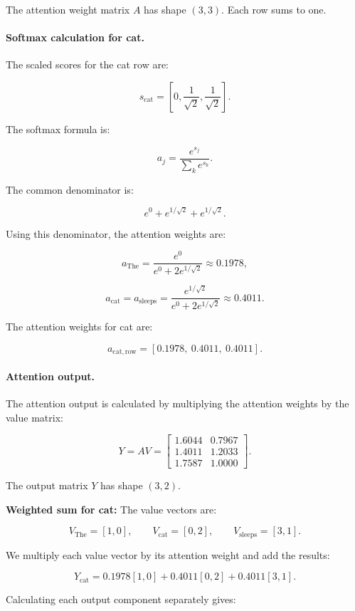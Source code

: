 \documentclass[11pt]{article}
\begin{document}
The attention weight matrix $A$ has shape $(3,3)$.
Each row sums to one.

\paragraph{Softmax calculation for cat.}

The scaled scores for the cat row are:

\[
s_{\mathrm{cat}}=
\left[
0,\frac{1}{\sqrt{2}},\frac{1}{\sqrt{2}}
\right].
\]

The softmax formula is:

\[
a_j=\frac{e^{s_j}}{\sum_k e^{s_k}}.
\]

The common denominator is:

\[
e^0+e^{1/\sqrt{2}}+e^{1/\sqrt{2}}.
\]

Using this denominator, the attention weights are:

\[
a_{\mathrm{The}}
=
\frac{e^0}
{e^0+2e^{1/\sqrt{2}}}
\approx 0.1978,
\]

\[
a_{\mathrm{cat}}
=
a_{\mathrm{sleeps}}
=
\frac{e^{1/\sqrt{2}}}
{e^0+2e^{1/\sqrt{2}}}
\approx 0.4011.
\]

The attention weights for cat are:

\[
a_{\mathrm{cat,row}}
=
[0.1978,\ 0.4011,\ 0.4011].
\]

\paragraph{Attention output.}

The attention output is calculated by multiplying
the attention weights by the value matrix:

\[
Y=AV=
\begin{bmatrix}
1.6044 & 0.7967\\
1.4011 & 1.2033\\
1.7587 & 1.0000
\end{bmatrix}.
\]

The output matrix $Y$ has shape $(3,2)$.

\textbf{Weighted sum for cat:} The value vectors are:

\[
V_{\mathrm{The}}=[1,0],\qquad
V_{\mathrm{cat}}=[0,2],\qquad
V_{\mathrm{sleeps}}=[3,1].
\]

We multiply each value vector by its attention
weight and add the results:

\[
Y_{\mathrm{cat}}
=
0.1978[1,0]
+
0.4011[0,2]
+
0.4011[3,1].
\]

Calculating each output component separately gives:
\end{document}
